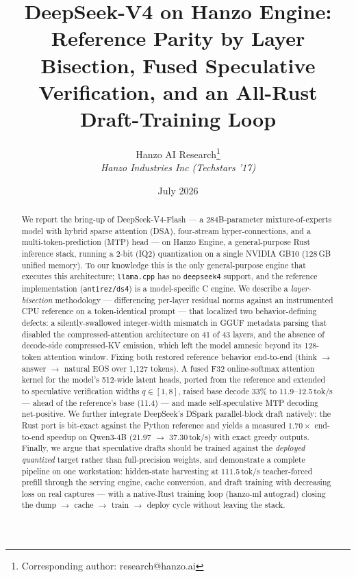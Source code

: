 \documentclass[11pt]{article}
\title{DeepSeek-V4 on Hanzo Engine: Reference Parity by Layer Bisection,
Fused Speculative Verification, and an All-Rust Draft-Training Loop}
\author{
    Hanzo AI Research\thanks{Corresponding author: research@hanzo.ai} \\
    \textit{Hanzo Industries Inc (Techstars '17)}
}
\date{July 2026}
\begin{document}
\maketitle

\begin{abstract}
We report the bring-up of DeepSeek-V4-Flash --- a 284B-parameter
mixture-of-experts model with hybrid sparse attention (DSA), four-stream
hyper-connections, and a multi-token-prediction (MTP) head --- on Hanzo
Engine, a general-purpose Rust inference stack, running a 2-bit (IQ2)
quantization on a single NVIDIA GB10 (128\,GB unified memory). To our
knowledge this is the only general-purpose engine that executes this
architecture; \texttt{llama.cpp} has no \texttt{deepseek4} support, and the
reference implementation (\texttt{antirez/ds4}) is a model-specific C
engine. We describe a \emph{layer-bisection} methodology --- differencing
per-layer residual norms against an instrumented CPU reference on a
token-identical prompt --- that localized two behavior-defining defects: a
silently-swallowed integer-width mismatch in GGUF metadata parsing that
disabled the compressed-attention architecture on 41 of 43 layers, and the
absence of decode-side compressed-KV emission, which left the model
amnesic beyond its 128-token attention window. Fixing both restored
reference behavior end-to-end (think $\rightarrow$ answer $\rightarrow$
natural EOS over 1{,}127 tokens). A fused F32 online-softmax attention
kernel for the model's 512-wide latent heads, ported from the reference
and extended to speculative verification widths $q \in [1,8]$, raised base
decode 33\% to 11.9--12.5\,tok/s --- ahead of the reference's base
(11.4) --- and made self-speculative MTP decoding net-positive. We further
integrate DeepSeek's DSpark parallel-block draft natively: the Rust port
is bit-exact against the Python reference and yields a measured
$1.70\times$ end-to-end speedup on Qwen3-4B (21.97 $\rightarrow$
37.30\,tok/s) with exact greedy outputs. Finally, we argue that
speculative drafts should be trained against the \emph{deployed quantized}
target rather than full-precision weights, and demonstrate a complete
pipeline on one workstation: hidden-state harvesting at 111.5\,tok/s
teacher-forced prefill through the serving engine, cache conversion, and
draft training with decreasing loss on real captures --- with a
native-Rust training loop (hanzo-ml autograd) closing the dump
$\rightarrow$ cache $\rightarrow$ train $\rightarrow$ deploy cycle without
leaving the stack.
\end{abstract}
\end{document}
